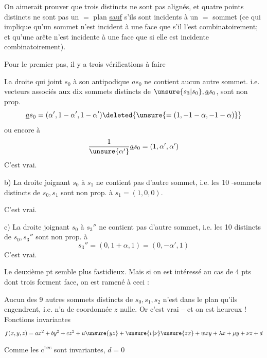 On aimerait prouver que  trois   distincts  ne sont pas alignés, et quatre points distincts ne sont pas   un $=$ plan \uline{sauf} s'ils  sont incidents  à un $=$ sommet (ce qui implique qu'un sommet n'est incident  à une face que s'il  l'est combinatoirement; et  qu'une arête n'est incidente  à une face que si elle est incidente combinatoirement).

Pour le premier pas, il y a trois vérifications à faire

 La droite qui joint $s_0$ à son antipodique $\underline a s_0$ ne contient aucun autre sommet. i.e.   vecteurs   associés aux dix sommets distincts de $\unsure{s_3|s_0},\underline a s_0$, sont non prop. 
\[
\underline a s_0=(\alpha',1-\alpha',1-\alpha')\deleted{\unsure{=(1,-1-\alpha,-1-\alpha)}}
\]
ou encore à
\[
\frac1{\unsure{\alpha'}}\underline a s_0=(1,\alpha',\alpha')
\]
\uline{} C'est vrai.
\margin{$\unsure{*}$}

b) La droite joignant $s_0$ à $s_1$ ne contient pas d'autre sommet, i.e. les 10 -sommets distincts de $s_0,s_1$ sont non prop. à $s_1=(1,0,0)$.

C'est vrai.

c) La droite joignant $s_0$ à $s_3''$ ne contient pas d'autre sommet, i.e. les 10  distincts de $s_0,s_3''$ sont non prop. à
\[
s_3''=(0,1+\alpha,1)
=(0,-\alpha',1)
\]
C'est vrai.

Le deuxième pt semble plus fastidieux. Mais si on est  intéressé au cas de 4 pts  dont trois forment face, on est ramené à ceci :

Aucun des 9 autres sommets distincts de $s_0,s_1,s_2$ n'est dans le plan qu'ils engendrent, i.e. n'a de coordonnée $z$ nulle. Or c'est vrai -- et on est heureux !
Fonctions  invariantes
\[
f(x,y,z)=ax^2+by^2+cz^2+u\unsure{yz}+\unsure{v|\nu}\unsure{zx}+wxy+\lambda x+\mu y+\nu z+d
\]
Comme les c\textsuperscript{tes} sont invariantes,  $d=0$

